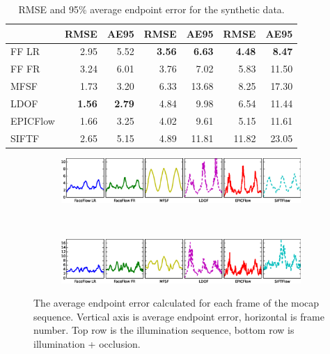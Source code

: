 \begin{table}
\begin{tabular}{lrrrrrr}
 & {\scriptsize RMSE} & {\scriptsize AE95} & {\scriptsize RMSE} & {\scriptsize AE95} & {\scriptsize RMSE} & {\scriptsize AE95} \\ \toprule
FF LR    & 2.95               & 5.52               & {\bf 3.56}         & {\bf 6.63}         & {\bf 4.48}         & {\bf 8.47}         \\
FF FR    & 3.24               & 6.01               & 3.76               & 7.02               & 5.83               & 11.50              \\
MFSF     & 1.73               & 3.20               & 6.33               & 13.68              & 8.25               & 17.30              \\
LDOF     & {\bf 1.56}         & {\bf 2.79}         & 4.84               & 9.98               & 6.54               & 11.44              \\
EPICFlow & 1.66               & 3.25               & 4.02               & 9.61               & 5.15               & 11.61              \\
SIFTF    & 2.65               & 5.15               & 4.89               & 11.81              & 11.82              & 23.05              \\ \bottomrule
    \end{tabular}
    \caption{RMSE and 95\% average endpoint error for the synthetic data.}
\label{tbl:synthetic}
\end{table}
\begin{figure}[t]
    \centering
    \begin{subfigure}{6in}
        \centering
        \includegraphics[width=\textwidth]{face_flow/images/synthetic/frame_error_5_flat}
    \end{subfigure}  \\
    \begin{subfigure}{6in}
        \centering
        \includegraphics[width=\textwidth]{face_flow/images/synthetic/frame_error_6_flat}
    \end{subfigure}
    \caption{The average endpoint error calculated for each frame of the mocap
             sequence. Vertical axis is average endpoint error, horizontal is
             frame number. Top row is the illumination sequence, bottom row is
             illumination + occlusion.}
\label{fig:per_frame_error}
\end{figure}
